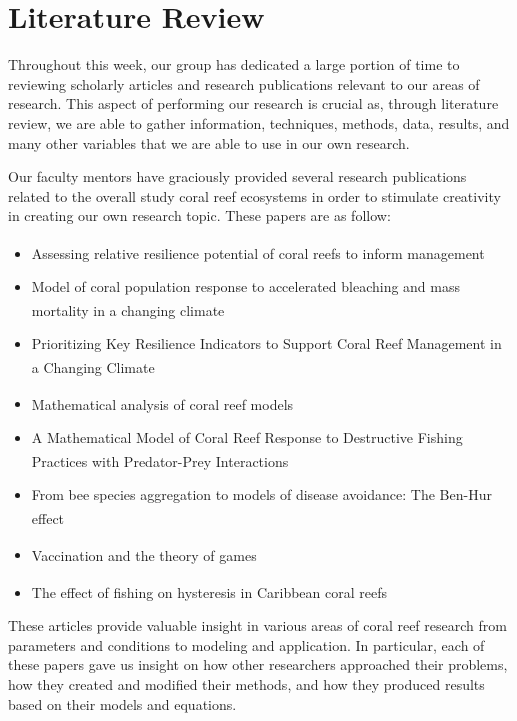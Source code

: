 \documentclass[12pt]{article}
\begin{document}
\section{Literature Review}
Throughout this week, our group has dedicated a large portion of time to reviewing scholarly articles and research publications relevant to our areas of research. This aspect of performing our research is crucial as, through literature review, we are able to gather information, techniques, methods, data, results, and many other variables that we are able to use in our own research. \par
Our faculty mentors have graciously provided several research publications related to the overall study coral reef ecosystems in order to stimulate creativity in creating our own research topic. These papers are as follow:
\begin{itemize}
    \item Assessing relative resilience potential of coral reefs to inform management\textsuperscript{\cite{01_assesing_relative}}
    \item Model of coral population response to accelerated bleaching and mass mortality in a changing climate\textsuperscript{\cite{02_Riegl_Purkis_Model}}
    \item Prioritizing Key Resilience Indicators to Support Coral Reef Management in a Changing Climate\textsuperscript{\cite{03_prioritize}}
    \item Mathematical analysis of coral reef models\textsuperscript{\cite{04_mathanalysis}}
    \item A Mathematical Model of Coral Reef Response to Destructive Fishing Practices with Predator-Prey Interactions\textsuperscript{\cite{05_quintero_machuca_cotto_bradley_ríos-soto_2016}}
    \item From bee species aggregation to models of disease avoidance: The Ben-Hur effect\textsuperscript{\cite{06_yong_herrera_castillo-chavez_2016}}
    \item Vaccination and the theory of games\textsuperscript{\cite{07_bauch_earn_2004}}
    \item The effect of fishing on hysteresis in Caribbean coral reefs \textsuperscript{\cite{13_blackwood_hastings_mumby_2010}}
\end{itemize}
These articles provide valuable insight in various areas of coral reef research from parameters and conditions to modeling and application. In particular, each of these papers gave us insight on how other researchers approached their problems, how they created and modified their methods, and how they produced results based on their models and equations. 
\end{document}
